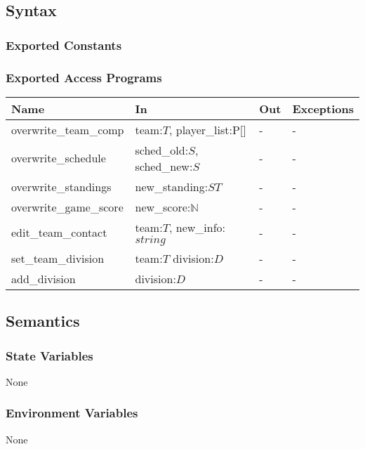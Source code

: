 \documentclass[12pt, titlepage]{article}
\begin{document}
\subsection{Syntax}

\subsubsection{Exported Constants}

\subsubsection{Exported Access Programs}

\begin{center}
\begin{tabular}{p{5cm} p{4cm} p{4cm} p{2cm}}
\hline
\textbf{Name} & \textbf{In} & \textbf{Out} & \textbf{Exceptions} \\
\hline
overwrite\_team\_comp & team:$T$, player\_list:P[] & - & - \\
overwrite\_schedule & sched\_old:$S$, sched\_new:$S$ & - & - \\
overwrite\_standings & new\_standing:$ST$ & - & - \\
overwrite\_game\_score & new\_score:$\mathbb{N}$ & - & - \\
edit\_team\_contact & team:$T$, new\_info:$string$ & - & - \\
set\_team\_division & team:$T$ division:$D$ & - & - \\
add\_division & division:$D$ & - & - \\

\hline
\end{tabular}
\end{center}

\subsection{Semantics}

\subsubsection{State Variables}

None

\subsubsection{Environment Variables}

None
\end{document}
